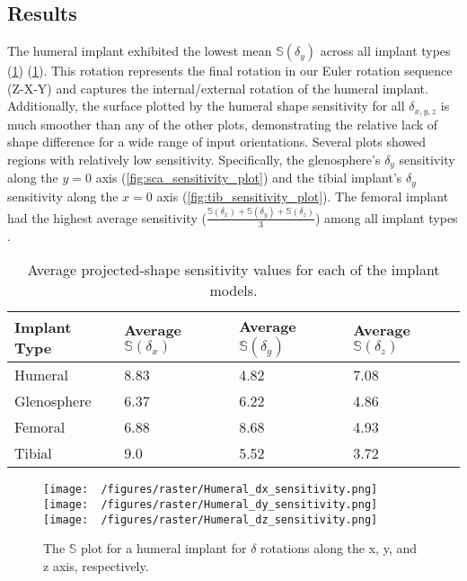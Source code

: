 \subsection{Results}
The humeral implant exhibited the lowest mean $\mathbb{S}(\delta_{y})$ across all implant types (\cref{fig:hum_sensitivity_plot}) (\cref{tab:ss-vals}).
This rotation represents the final rotation in our Euler rotation sequence (Z-X-Y) and captures the internal/external rotation of the humeral implant.
Additionally, the surface plotted by the humeral shape sensitivity for all $\delta_{x,y,z}$ is much smoother than any of the other plots, demonstrating the relative lack of shape difference for a wide range of input orientations.
Several plots showed regions with relatively low sensitivity.
Specifically, the glenosphere's $\delta_{y}$ sensitivity along the $y=0$ axis (\cref{fig:sca_sensitivity_plot}) and the tibial implant's $\delta_{y}$ sensitivity along the $x=0$ axis (\cref{fig:tib_sensitivity_plot}).
The femoral implant had the highest average sensitivity ($\frac{\mathbb{S}(\delta_{x}) +\mathbb{S}(\delta_{y}) +\mathbb{S}(\delta_{z})  }{3}$) among all implant types .


\begin{table}
	\caption{Average projected-shape sensitivity values for each of the implant models.} \label{tab:ss-vals}
	\begin{tabularx}{\linewidth}{|X|X|X|X|}\hline
		{\bf Implant Type} & Average $\mathbb{S}(\delta_{x})$ & Average  $\mathbb{S}(\delta_{y})$ & Average $\mathbb{S}(\delta_{z})$ \\ \hline
		Humeral            & 8.83                             & 4.82                              & 7.08                             \\\hline
		Glenosphere        & 6.37                             & 6.22                              & 4.86                             \\\hline
		Femoral            & 6.88                             & 8.68                              & 4.93                             \\\hline
		Tibial             & 9.0                              & 5.52                              & 3.72                             \\\hline
	\end{tabularx}
\end{table}


\begin{figure}[h!]
	\centering
	\texttt{[image: ~/figures/raster/Humeral\_dx\_sensitivity.png]}
	\texttt{[image: ~/figures/raster/Humeral\_dy\_sensitivity.png]}
	\texttt{[image: ~/figures/raster/Humeral\_dz\_sensitivity.png]}
	\caption{The $\mathbb{S}$ plot for a humeral implant for $\delta$ rotations along the x, y, and z axis, respectively.}
	\label{fig:hum_sensitivity_plot}
\end{figure}

